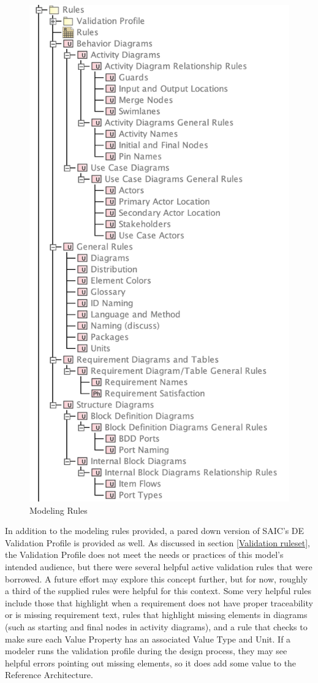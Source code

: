 \begin{figure}[H]
    \centering
    \includegraphics[width=3 in]{Thesis/Analysis_and_Results/Analysis and Results Figures/Rules.png}
    \caption{Modeling Rules}
    \label{fig:Modeling Rules}
\end{figure}

In addition to the modeling rules provided, a pared down version of SAIC's DE Validation Profile \citep{SAIC} is provided as well. As discussed in section \ref{Validation ruleset}, the Validation Profile does not meet the needs or practices of this model's intended audience, but there were several helpful active validation rules that were borrowed. A future effort may explore this concept further, but for now, roughly a third of the supplied rules were helpful for this context. Some very helpful rules include those that highlight when a requirement does not have proper traceability or is missing requirement text, rules that highlight missing elements in diagrams (such as starting and final nodes in activity diagrams), and a rule that checks to make sure each Value Property has an associated Value Type and Unit. If a modeler runs the validation profile during the design process, they may see helpful errors pointing out missing elements, so it does add some value to the Reference Architecture. 